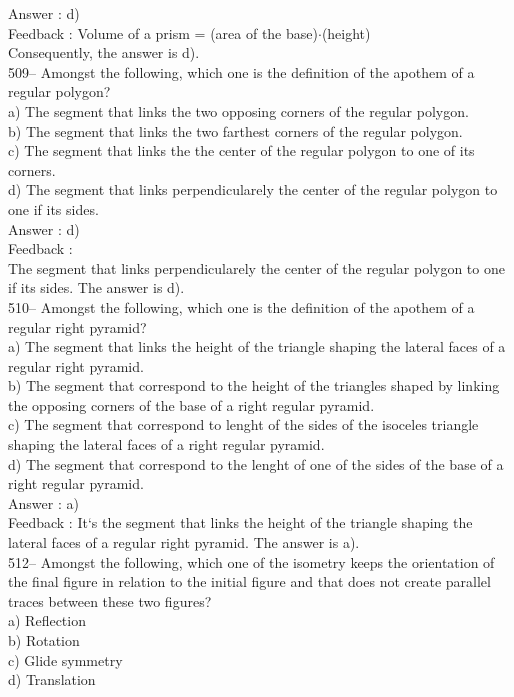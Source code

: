 \documentclass[letterpaper, 12pt]{article}
\begin{document}
Answer : d)\\

Feedback :
Volume of a prism = (area of the base)$\cdot$(height)\\
Consequently, the answer is d).\\

509-- Amongst the following, which one is the definition of the apothem of a regular polygon?\\
a) The segment that links the two opposing corners of the regular polygon.\\
b) The segment that links the two farthest corners of the regular polygon.\\
c) The segment that links the the center of the regular polygon to one of its corners.\\
d) The segment that links perpendicularely the center of the regular polygon to one if its sides.\\

Answer : d)\\

Feedback :  \\
The segment that links perpendicularely the center of the regular polygon to one if its sides.  The answer is d).\\

510-- Amongst the following, which one is the definition of the apothem of a regular right pyramid?\\
a) The segment that links the height of the triangle shaping the lateral faces of a regular right pyramid. \\
b) The segment that correspond to the height of the triangles shaped by linking the opposing corners of the base of a right regular pyramid.\\
c) The segment that correspond to lenght of the sides of the isoceles triangle shaping the lateral faces of a right regular pyramid.\\
d) The segment that correspond to the lenght of one of the sides of the base of a right regular pyramid.\\

Answer : a)\\

Feedback :
It`s the segment that links the height of the triangle shaping the lateral faces of a regular right pyramid.  The answer is a).\\


512--  Amongst the following, which one of the isometry keeps the orientation of the final figure in relation to the initial figure and that does not create parallel traces between these two figures?\\
a) Reflection\\
b) Rotation\\
c) Glide symmetry\\
d) Translation\\
\end{document}
